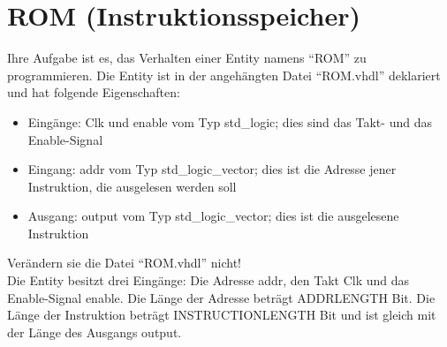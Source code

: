 \documentclass[a4paper,12pt]{article}
\begin{document}
\pagestyle{empty}
\setlength{\parindent}{0em}
\section*{ROM (Instruktionsspeicher)}


Ihre Aufgabe ist es, das Verhalten einer Entity  namens "`ROM"' zu programmieren. Die Entity ist in der angeh\"angten Datei "`ROM.vhdl"' deklariert und hat folgende Eigenschaften:
\begin{itemize}
\item Eing\"ange: Clk und enable vom Typ std\_logic; dies sind das Takt- und das Enable-Signal
\item Eingang: addr vom Typ std\_logic\_vector; dies ist die Adresse jener Instruktion, die ausgelesen werden soll
\item Ausgang: output vom Typ std\_logic\_vector; dies ist die ausgelesene Instruktion
\end{itemize}
\vspace{0.3cm}
\begin{center}
\end{center}

Ver\"andern sie die Datei "`ROM.vhdl"' nicht!\\

Die Entity besitzt drei Eing\"ange: Die Adresse addr, den Takt Clk und das Enable-Signal enable. Die L\"ange der Adresse betr\"agt {{ADDRLENGTH}} Bit. Die L\"ange der Instruktion betr\"agt {{INSTRUCTIONLENGTH}} Bit und ist gleich mit der L\"ange des Ausgangs output.\\
\end{document}

